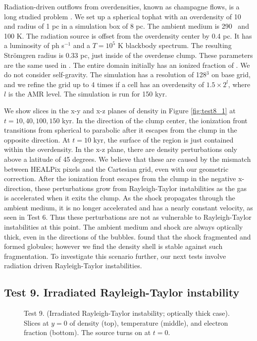 \documentclass[apj,onecolumn]{emulateapj}
\begin{document}
Radiation-driven outflows from overdensities, known as champagne
flows, is a long studied problem \citep[e.g.][\S3.3]{Yorke86}.  We set
up a spherical tophat with an overdensity of 10 and radius of 1 pc in
a simulation box of 8 pc.  The ambient medium is 290 \cubecm~and 100
K.  The radiation source is offset from the overdensity center by 0.4
pc.  It has a luminosity of  ph s$^{-1}$ and a $T=10^5$ K
blackbody spectrum.  The resulting Str\"{o}mgren radius is 0.33 pc,
just inside of the overdense clump.  These parameters are the same
used in \citet{Bisbas09}.  The entire domain initially has an ionized
fraction of .  We do not consider self-gravity.  The
simulation has a resolution of 128$^3$ on base grid, and we refine the
grid up to 4 times if a cell has an overdensity of $1.5 \times 2^l$,
where $l$ is the AMR level.  The simulation is run for 150 kyr.

We show slices in the x-y and x-z planes of density in Figure
\ref{fig:test8_1} at $t = 10, 40, 100, 150$ kyr.  In the direction of
the clump center, the ionization front transitions from spherical to
parabolic after it escapes from the clump in the opposite direction.
At $t = 10$ kyr, the surface of the  region is just
contained within the overdensity.  In the x-z plane, there are density
perturbations only above a latitude of 45 degrees.  We believe that
these are caused by the mismatch between HEALPix pixels and the
Cartesian grid, even with our geometric correction.  After the
ionization front escapes from the clump in the negative x-direction,
these perturbations grow from Rayleigh-Taylor instabilities as the gas
is accelerated when it exits the clump.  As the shock propagates
through the ambient medium, it is no longer accelerated and has a
nearly constant velocity, as seen in Test 6.  Thus these perturbations
are not as vulnerable to Rayleigh-Taylor instabilities at this point.
The ambient medium and shock are always optically thick, even in the
directions of the bubbles.  \citeauthor{Bisbas09} found that the shock
fragmented and formed globules; however we find the density shell is
stable against such fragmentation.  To investigate this scenario
further, our next tests involve radiation driven Rayleigh-Taylor
instabilities.

\subsection{Test 9. Irradiated Rayleigh-Taylor instability}

\begin{figure}[t]
  \caption{\label{fig:test9_thick} Test 9. (Irradiated Rayleigh-Taylor
    instability; optically thick case).  Slices at $y=0$ of density
    (top), temperature (middle), and electron fraction (bottom).  The
    source turns on at $t=0$.}
\end{figure}
\end{document}

